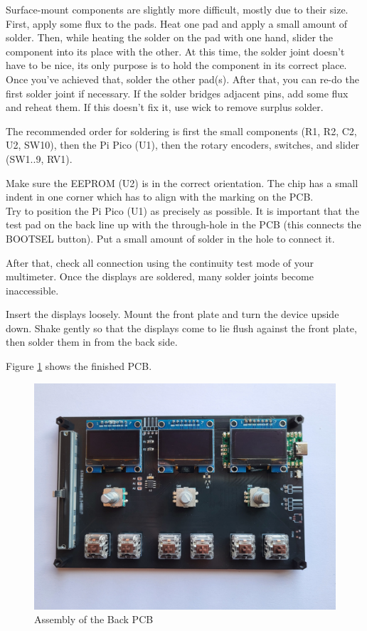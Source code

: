 \documentclass{article}
\begin{document}
Surface-mount components are slightly more difficult, mostly due to their size. First, apply some flux to the pads. Heat one pad and apply a small amount of solder. Then, while heating the solder on the pad with one hand, slider the component into its place with the other. At this time, the solder joint doesn't have to be nice, its only purpose is to hold the component in its correct place. Once you've achieved that, solder the other pad(s). After that, you can re-do the first solder joint if necessary. 
If the solder bridges adjacent pins, add some flux and reheat them. If this doesn't fix it, use wick to remove surplus solder. 

The recommended order for soldering is first the small components (R1, R2, C2, U2, SW10), then the Pi Pico (U1), then the rotary encoders, switches, and slider (SW1..9, RV1). 

Make sure the EEPROM (U2) is in the correct orientation. The chip has a small indent in one corner which has to align with the marking on the PCB.\\
Try to position the Pi Pico (U1) as precisely as possible. It is important that the test pad on the back line up with the through-hole in the PCB (this connects the BOOTSEL button). Put a small amount of solder in the hole to connect it. 

After that, check all connection using the continuity test mode of your multimeter. Once the displays are soldered, many solder joints become inaccessible. 

Insert the displays loosely. Mount the front plate and turn the device upside down. Shake gently so that the displays come to lie flush against the front plate, then solder them in from the back side. 

Figure \ref{fig:assembly} shows the finished PCB. 

\begin{figure}[htb]
\centering
\includegraphics[width=\textwidth]{Images/Assembly.jpg}
\caption{Assembly of the Back PCB}
\label{fig:assembly}
\end{figure}
\end{document}
